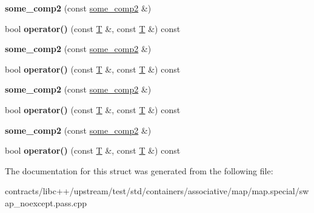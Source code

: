 \begin{DoxyCompactItemize}
{\bfseries some\+\_\+comp2} (const \mbox{\hyperlink{structsome__comp2}{some\+\_\+comp2}} \&)
\item 
\mbox{\label{structsome__comp2_aea6067e7319c279ca4f6d8202b31eeb2}} 
bool {\bfseries operator()} (const \mbox{\hyperlink{struct_t}{T}} \&, const \mbox{\hyperlink{struct_t}{T}} \&) const
\item 
\mbox{\label{structsome__comp2_a2c0954b461c474a4e8db9e1118686006}} 
{\bfseries some\+\_\+comp2} (const \mbox{\hyperlink{structsome__comp2}{some\+\_\+comp2}} \&)
\item 
\mbox{\label{structsome__comp2_aea6067e7319c279ca4f6d8202b31eeb2}} 
bool {\bfseries operator()} (const \mbox{\hyperlink{struct_t}{T}} \&, const \mbox{\hyperlink{struct_t}{T}} \&) const
\item 
\mbox{\label{structsome__comp2_a2c0954b461c474a4e8db9e1118686006}} 
{\bfseries some\+\_\+comp2} (const \mbox{\hyperlink{structsome__comp2}{some\+\_\+comp2}} \&)
\item 
\mbox{\label{structsome__comp2_aea6067e7319c279ca4f6d8202b31eeb2}} 
bool {\bfseries operator()} (const \mbox{\hyperlink{struct_t}{T}} \&, const \mbox{\hyperlink{struct_t}{T}} \&) const
\item 
\mbox{\label{structsome__comp2_a2c0954b461c474a4e8db9e1118686006}} 
{\bfseries some\+\_\+comp2} (const \mbox{\hyperlink{structsome__comp2}{some\+\_\+comp2}} \&)
\item 
\mbox{\label{structsome__comp2_aea6067e7319c279ca4f6d8202b31eeb2}} 
bool {\bfseries operator()} (const \mbox{\hyperlink{struct_t}{T}} \&, const \mbox{\hyperlink{struct_t}{T}} \&) const
\end{DoxyCompactItemize}


The documentation for this struct was generated from the following file\+:\begin{DoxyCompactItemize}
\item 
contracts/libc++/upstream/test/std/containers/associative/map/map.\+special/swap\+\_\+noexcept.\+pass.\+cpp\end{DoxyCompactItemize}
